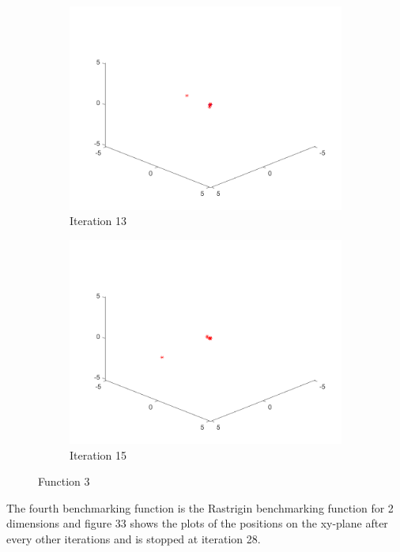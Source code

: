 \begin{figure}
\begin{subfigure}[b]{0.4\textwidth}
    \includegraphics[width=\textwidth]{img/smpl/fn4d/loa-iter-13}
    \caption{Iteration 13}
    \label{fig:s3-iter-6}
  \end{subfigure}
  \begin{subfigure}[b]{0.4\textwidth}
    \includegraphics[width=\textwidth]{img/smpl/fn4d/loa-iter-15}
    \caption{Iteration 15}
    \label{fig:s3-iter-7}
  \end{subfigure}
  \caption{Function 3}
\end{figure}

The fourth benchmarking function is the Rastrigin benchmarking function for 2 dimensions and figure 33 shows the plots of the positions on the xy-plane after every other iterations and is stopped at iteration 28.

